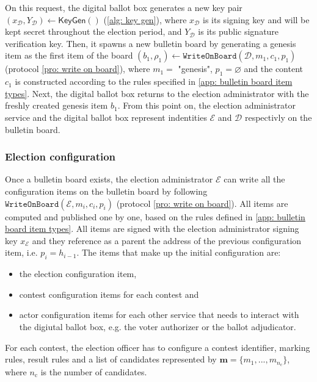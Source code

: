 On this request, the digital ballot box generates a new key pair $(x_\mathcal{D}, Y_\mathcal{D}) \gets \mathsf{KeyGen}()$ (\cref{alg: key gen}), where $x_\mathcal{D}$ is its signing key and will be kept secret throughout the election period, and $Y_\mathcal{D}$ is its public signature verification key. Then, it spawns a new bulletin board by generating a genesis item as the first item of the board $(b_1, \rho_1) \gets \mathtt{WriteOnBoard}(\mathcal{D}, m_1, c_1, p_1)$ (protocol \ref{pro: write on board}), where $m_1 = $ "genesis", $p_1 = \varnothing$ and the content $c_1$ is constructed according to the rules specified in \cref{app: bulletin board item types}. Next, the digital ballot box returns to the election administrator with the freshly created genesis item $b_1$. From this point on, the election administrator service and the digital ballot box represent indentities $\mathcal{E}$ and $\mathcal{D}$ respectivly on the bulletin board.


\subsubsection{Election configuration} \label{sec: election configuration}
Once a bulletin board exists, the election administrator $\mathcal{E}$ can write all the configuration items on the bulletin board by following $\mathtt{WriteOnBoard}(\mathcal{E}, m_i, c_i, p_i)$ (protocol \ref{pro: write on board}). All items are computed and published one by one, based on the rules defined in \cref{app: bulletin board item types}. All items are signed with the election administrator signing key $x_\mathcal{E}$ and they reference as a parent the address of the previous configuration item, i.e. $p_i = h_{i-1}$. The items that make up the initial configuration are:
\begin{itemize}
    \item the election configuration item,
    \item contest configuration items for each contest and
    \item actor configuration items for each other service that needs to interact with the digiutal ballot box, e.g. the voter authorizer or the ballot adjudicator.
\end{itemize}

For each contest, the election officer has to configure a contest identifier, marking rules, result rules and a list of candidates represented by $\boldsymbol{m} = \{ m_1, ..., m_{n_\mathrm{c}} \}$, where $n_\mathrm{c}$ is the number of candidates.

